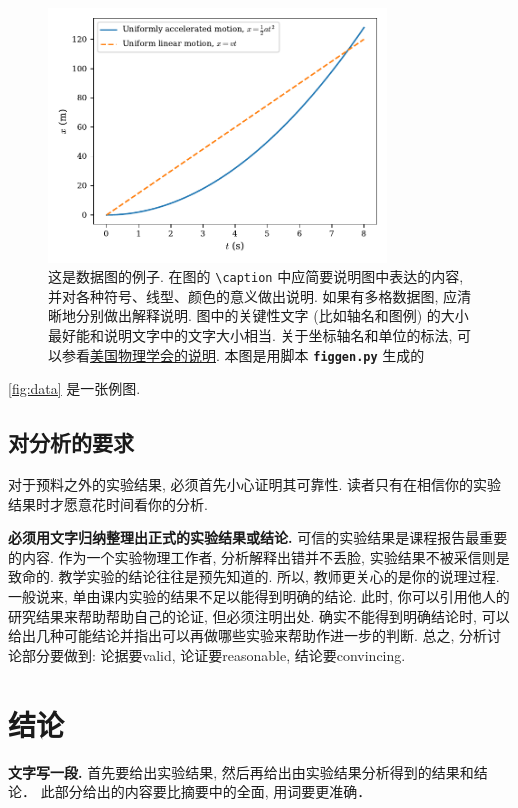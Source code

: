 \documentclass[font=fandol]{mpltx}
\newcommand{\note}[1]{{\color{gray}#1}}
\newcommand*\cs[1]{\texttt{\textbackslash #1}}
\newcommand*\file[1]{\textbf{\texttt{#1}}}
\begin{document}
\begin{figure}
	\centering
	\includegraphics[width=0.8\textwidth]{fig/figsample.pdf}
	\caption{这是数据图的例子.
		\note{在图的 \cs{caption} 中应简要说明图中表达的内容, 并对各种符号、线型、颜色的意义做出说明.
			如果有多格数据图, 应清晰地分别做出解释说明.
			图中的关键性文字 (比如轴名和图例) 的大小最好能和说明文字中的文字大小相当.
			关于坐标轴名和单位的标法, 可以参看\href{https://journals.aps.org/authors/axis-labels-and-scales-on-graphs-h18}{美国物理学会的说明}.
			本图是用脚本 \file{figgen.py} 生成的}}
	\label{fig:data}
\end{figure}

\autoref{fig:data} 是一张例图.

\subsection{对分析的要求}

对于预料之外的实验结果, 必须首先小心证明其可靠性.
读者只有在相信你的实验结果时才愿意花时间看你的分析.

\textbf{必须用文字归纳整理出正式的实验结果或结论.}
可信的实验结果是课程报告最重要的内容.
作为一个实验物理工作者, 分析解释出错并不丢脸, 实验结果不被采信则是致命的.
教学实验的结论往往是预先知道的.
所以, 教师更关心的是你的说理过程.
一般说来, 单由课内实验的结果不足以能得到明确的结论.
此时, 你可以引用他人的研究结果来帮助帮助自己的论证, 但必须注明出处.
确实不能得到明确结论时, 可以给出几种可能结论并指出可以再做哪些实验来帮助作进一步的判断.
总之, 分析讨论部分要做到: 论据要valid, 论证要reasonable, 结论要convincing.

\section{结论}
\textbf{文字写一段.}
首先要给出实验结果, 然后再给出由实验结果分析得到的结果和结论．
此部分给出的内容要比摘要中的全面, 用词要更准确．
\end{document}
